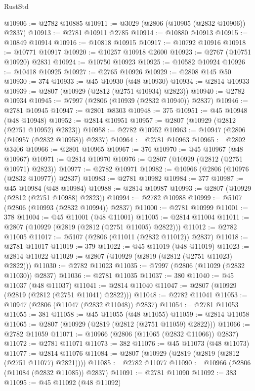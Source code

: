 \begin{lexlean}{RustStd}
\begin{coremodule}
@10906 := @2782 @10885
@10911 := @3029 (@2806 (@10905 (@2832 @10906)) @2837)
@10913 := @2781 @10911 @2785
@10914 := @10880 @10913
@10915 := @10849 @10914
@10916 := @10818 @10915
@10917 := @10792 @10916
@10918 := @10771 @10917
@10920 := @10257 @10918 @2600
@10923 := @2767 (@10751 @10920) @2831
@10924 := @10750 @10923
@10925 := @10582 @10924
@10926 := @10418 @10925
@10927 := @2765 @10926
@10929 := @2808 @145 @50
@10930 := 374
@10933 := @45 @10930 (@48 @10930)
@10934 := @2814 @10933
@10939 := @2807 (@10929 (@2812 (@2751 @10934) @2823))
@10940 := @2782 @10934
@10945 := @7997 (@2806 (@10939 (@2832 @10940)) @2837)
@10946 := @2781 @10945
@10947 := @2801 @8303
@10948 := 375
@10951 := @45 @10948 (@48 @10948)
@10952 := @2814 @10951
@10957 := @2807 (@10929 (@2812 (@2751 @10952) @2823))
@10958 := @2782 @10952
@10963 := @10947 (@2806 (@10957 (@2832 @10958)) @2837)
@10964 := @2781 @10963
@10965 := @2802 @3406
@10966 := @2801 @10965
@10967 := 376
@10970 := @45 @10967 (@48 @10967)
@10971 := @2814 @10970
@10976 := @2807 (@10929 (@2812 (@2751 @10971) @2823))
@10977 := @2782 @10971
@10982 := @10966 (@2806 (@10976 (@2832 @10977)) @2837)
@10983 := @2781 @10982
@10984 := 377
@10987 := @45 @10984 (@48 @10984)
@10988 := @2814 @10987
@10993 := @2807 (@10929 (@2812 (@2751 @10988) @2823))
@10994 := @2782 @10988
@10999 := @5107 (@2806 (@10993 (@2832 @10994)) @2837)
@11000 := @2781 @10999
@11001 := 378
@11004 := @45 @11001 (@48 @11001)
@11005 := @2814 @11004
@11011 := @2807 (@10929 (@2819 (@2812 (@2751 @11005) @2822)))
@11012 := @2782 @11005
@11017 := @5107 (@2806 (@11011 (@2832 @11012)) @2837)
@11018 := @2781 @11017
@11019 := 379
@11022 := @45 @11019 (@48 @11019)
@11023 := @2814 @11022
@11029 := @2807 (@10929 (@2819 (@2812 (@2751 @11023) @2822)))
@11030 := @2782 @11023
@11035 := @7997 (@2806 (@11029 (@2832 @11030)) @2837)
@11036 := @2781 @11035
@11037 := 380
@11040 := @45 @11037 (@48 @11037)
@11041 := @2814 @11040
@11047 := @2807 (@10929 (@2819 (@2812 (@2751 @11041) @2822)))
@11048 := @2782 @11041
@11053 := @10947 (@2806 (@11047 (@2832 @11048)) @2837)
@11054 := @2781 @11053
@11055 := 381
@11058 := @45 @11055 (@48 @11055)
@11059 := @2814 @11058
@11065 := @2807 (@10929 (@2819 (@2812 (@2751 @11059) @2822)))
@11066 := @2782 @11059
@11071 := @10966 (@2806 (@11065 (@2832 @11066)) @2837)
@11072 := @2781 @11071
@11073 := 382
@11076 := @45 @11073 (@48 @11073)
@11077 := @2814 @11076
@11084 := @2807 (@10929 (@2819 (@2819 (@2812 (@2751 @11077) @2821))))
@11085 := @2782 @11077
@11090 := @10966 (@2806 (@11084 (@2832 @11085)) @2837)
@11091 := @2781 @11090
@11092 := 383
@11095 := @45 @11092 (@48 @11092)

\end{coremodule}
\end{lexlean}
